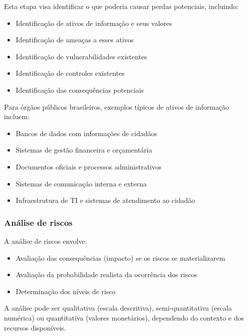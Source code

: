 \documentclass[12pt,a4paper]{report}
\begin{document}
Esta etapa visa identificar o que poderia causar perdas potenciais, incluindo:

\begin{itemize}
  \item Identificação de ativos de informação e seus valores
  \item Identificação de ameaças a esses ativos
  \item Identificação de vulnerabilidades existentes
  \item Identificação de controles existentes
  \item Identificação das consequências potenciais
\end{itemize}

\begin{infobox}
Para órgãos públicos brasileiros, exemplos típicos de ativos de informação incluem:

\begin{itemize}
  \item Bancos de dados com informações de cidadãos
  \item Sistemas de gestão financeira e orçamentária
  \item Documentos oficiais e processos administrativos
  \item Sistemas de comunicação interna e externa
  \item Infraestrutura de TI e sistemas de atendimento ao cidadão
\end{itemize}
\end{infobox}

\subsubsection{Análise de riscos}

A análise de riscos envolve:

\begin{itemize}
  \item Avaliação das consequências (impacto) se os riscos se materializarem
  \item Avaliação da probabilidade realista da ocorrência dos riscos
  \item Determinação dos níveis de risco
\end{itemize}

A análise pode ser qualitativa (escala descritiva), semi-quantitativa (escala numérica) ou quantitativa (valores monetários), dependendo do contexto e dos recursos disponíveis.
\end{document}
